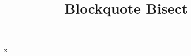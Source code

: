 \documentclass[type=zwischenbericht]{zukunftbau}
\title{Blockquote Bisect}
\begin{document}
\begin{Blockquote}x\end{Blockquote}
\end{document}
